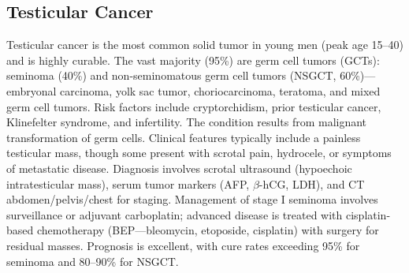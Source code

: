 \subsection{Testicular Cancer}
\label{sec:Testicular Cancer}
Testicular cancer is the most common solid tumor in young men (peak age 15--40) and is highly curable. The vast majority (95\%) are germ cell tumors (GCTs): seminoma (40\%) and non-seminomatous germ cell tumors (NSGCT, 60\%)---embryonal carcinoma, yolk sac tumor, choriocarcinoma, teratoma, and mixed germ cell tumors. Risk factors include cryptorchidism, prior testicular cancer, Klinefelter syndrome, and infertility. The condition results from malignant transformation of germ cells. Clinical features typically include a painless testicular mass, though some present with scrotal pain, hydrocele, or symptoms of metastatic disease. Diagnosis involves scrotal ultrasound (hypoechoic intratesticular mass), serum tumor markers (AFP, $\beta$-hCG, LDH), and CT abdomen/pelvis/chest for staging. Management of stage I seminoma involves surveillance or adjuvant carboplatin; advanced disease is treated with cisplatin-based chemotherapy (BEP---bleomycin, etoposide, cisplatin) with surgery for residual masses. Prognosis is excellent, with cure rates exceeding 95\% for seminoma and 80--90\% for NSGCT.

